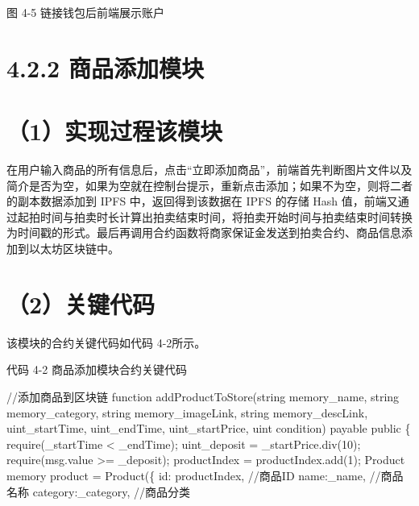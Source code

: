 \documentclass[
  10
]{article}
\newenvironment{Shaded}{}{}
\newcommand{\NormalTok}[1]{#1}
\begin{document}
图 4-5 链接钱包后前端展示账户

\section{4.2.2 商品添加模块}\label{ux5546ux54c1ux6dfbux52a0ux6a21ux5757}

\section{（1）实现过程该模块}\label{ux5b9eux73b0ux8fc7ux7a0bux8be5ux6a21ux5757}

在用户输入商品的所有信息后，点击``立即添加商品''，前端首先判断图片文件以及简介是否为空，如果为空就在控制台提示，重新点击添加；如果不为空，则将二者的副本数据添加到
IPFS 中，返回得到该数据在 IPFS 的存储 Hash
值，前端又通过起拍时间与拍卖时长计算出拍卖结束时间，将拍卖开始时间与拍卖结束时间转换为时间戳的形式。最后再调用合约函数将商家保证金发送到拍卖合约、商品信息添加到以太坊区块链中。

\section{（2）关键代码}\label{ux5173ux952eux4ee3ux7801-1}

该模块的合约关键代码如代码 4-2所示。

代码 4-2 商品添加模块合约关键代码

\begin{Shaded}
\begin{Highlighting}[]
\NormalTok{//添加商品到区块链  }
\NormalTok{function addProductToStore(string memory\_name, string memory\_category, string memory\_imageLink, string memory\_descLink, uint\_startTime, uint\_endTime, uint\_startPrice, uint condition) payable public \{  }
\NormalTok{    require(\_startTime \textless{} \_endTime);  }
\NormalTok{    uint\_deposit = \_startPrice.div(10);  }
\NormalTok{    require(msg.value \textgreater{}= \_deposit);  }
\NormalTok{    productIndex = productIndex.add(1);  }
\NormalTok{    Product memory product = Product(\{  }
\NormalTok{        id: productIndex, //商品ID  }
\NormalTok{        name:\_name, //商品名称  }
\NormalTok{        category:\_category, //商品分类}
\end{Highlighting}
\end{Shaded}
\end{document}
